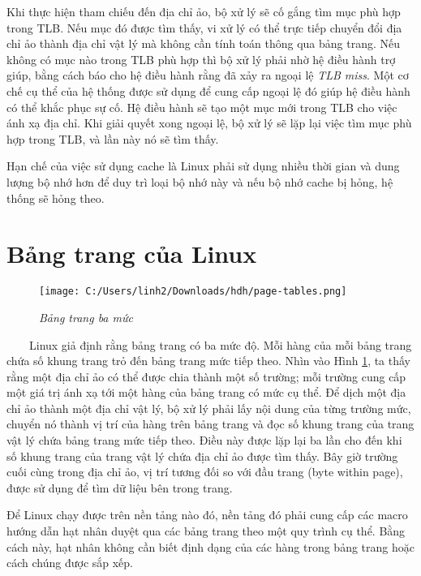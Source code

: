\documentclass{article}
\begin{document}
\begin{description}
  Khi thực hiện tham chiếu đến địa chỉ ảo, bộ xử lý sẽ cố gắng tìm mục phù hợp trong TLB. Nếu mục đó được tìm thấy, vi xử lý có thể trực tiếp chuyển đổi địa chỉ ảo thành địa chỉ vật lý mà không cần tính toán thông qua bảng trang. Nếu không có mục nào trong TLB phù hợp thì bộ xử lý phải nhờ hệ điều hành trợ giúp, bằng cách báo cho hệ điều hành rằng đã xảy ra ngoại lệ \textit{TLB miss}. Một cơ chế cụ thể của hệ thống được sử dụng để cung cấp ngoại lệ đó giúp hệ điều hành có thể khắc phục sự cố. Hệ điều hành sẽ tạo một mục mới trong TLB cho việc ánh xạ địa chỉ. Khi giải quyết xong ngoại lệ, bộ xử lý sẽ lặp lại việc tìm mục phù hợp trong TLB, và lần này nó sẽ tìm thấy.
\end{description}

Hạn chế của việc sử dụng cache là Linux phải sử dụng nhiều thời gian và dung lượng bộ nhớ hơn để duy trì loại bộ nhớ này và nếu bộ nhớ cache bị hỏng, hệ thống sẽ hỏng theo.

\section{Bảng trang của Linux}

\begin{figure}[H]
  \centering
  \texttt{[image: C:/Users/linh2/Downloads/hdh/page-tables.png]}
  \caption{\textit{Bảng trang ba mức}}
  \label{fig:linuxpagetables}
\end{figure}

~~~~Linux giả định rằng bảng trang có ba mức độ. Mỗi hàng của mỗi bảng trang chứa số khung trang trỏ đến bảng trang mức tiếp theo. Nhìn vào Hình \ref{fig:linuxpagetables}, ta thấy rằng một địa chỉ ảo có thể được chia thành một số trường; mỗi trường cung cấp một giá trị ánh xạ tới một hàng của bảng trang có mức cụ thể. Để dịch một địa chỉ ảo thành một địa chỉ vật lý, bộ xử lý phải lấy nội dung của từng trường mức, chuyển nó thành vị trí của hàng trên bảng trang và đọc số khung trang của trang vật lý chứa bảng trang mức tiếp theo. Điều này được lặp lại ba lần cho đến khi số khung trang của trang vật lý chứa địa chỉ ảo được tìm thấy. Bây giờ trường cuối cùng trong địa chỉ ảo, vị trí tương đối so với đầu trang (byte within page), được sử dụng để tìm dữ liệu bên trong trang.\vspace{1em}

Để Linux chạy được trên nền tảng nào đó, nền tảng đó phải cung cấp các macro hướng dẫn hạt nhân duyệt qua các bảng trang theo một quy trình cụ thể. Bằng cách này, hạt nhân không cần biết định dạng của các hàng trong bảng trang hoặc cách chúng được sắp xếp.\vspace{1em}
\end{document}
